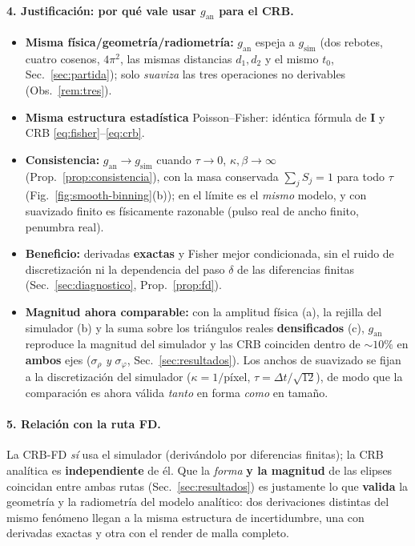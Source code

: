 \documentclass[11pt,a4paper]{article}
\theoremstyle{plain}
\theoremstyle{definition}
\newcommand{\matr}[1]{\mathbf{#1}}
\begin{document}
\paragraph{4. Justificaci\'on: por qu\'e vale usar $g_{\mathrm{an}}$ para el CRB.}
\begin{itemize}[nosep]
    \item \textbf{Misma f\'isica/geometr\'ia/radiometr\'ia:} $g_{\mathrm{an}}$
    espeja a $g_{\mathrm{sim}}$ (dos rebotes, cuatro cosenos, $4\pi^2$, las mismas
    distancias $d_1,d_2$ y el mismo $t_0$, Sec.~\ref{sec:partida}); solo
    \emph{suaviza} las tres operaciones no derivables (Obs.~\ref{rem:tres}).
    \item \textbf{Misma estructura estad\'istica} Poisson--Fisher: id\'entica
    f\'ormula de $\matr I$ y CRB \eqref{eq:fisher}--\eqref{eq:crb}.
    \item \textbf{Consistencia:} $g_{\mathrm{an}}\to g_{\mathrm{sim}}$ cuando
    $\tau\to0$, $\kappa,\beta\to\infty$ (Prop.~\ref{prop:consistencia}), con la
    masa conservada $\sum_j S_j=1$ para todo $\tau$
    (Fig.~\ref{fig:smooth-binning}(b)); en el l\'imite es el \emph{mismo} modelo,
    y con suavizado finito es f\'isicamente razonable (pulso real de ancho finito,
    penumbra real).
    \item \textbf{Beneficio:} derivadas \textbf{exactas} y Fisher mejor
    condicionada, sin el ruido de discretizaci\'on ni la dependencia del paso
    $\delta$ de las diferencias finitas (Sec.~\ref{sec:diagnostico},
    Prop.~\ref{prop:fd}).
    \item \textbf{Magnitud ahora comparable:} con la amplitud f\'isica (a), la
    rejilla del simulador (b) y la suma sobre los tri\'angulos reales
    \textbf{densificados} (c), $g_{\mathrm{an}}$ reproduce la magnitud del
    simulador y las CRB coinciden dentro de $\sim\!10\%$ en \textbf{ambos} ejes
    ($\sigma_\rho$ \emph{y} $\sigma_\varphi$, Sec.~\ref{sec:resultados}). Los anchos
    de suavizado se fijan a la discretizaci\'on del simulador ($\kappa=1/$p\'ixel,
    $\tau=\Delta t/\sqrt{12}$), de modo que la comparaci\'on es ahora v\'alida
    \emph{tanto} en forma \emph{como} en tama\~no.
\end{itemize}

\paragraph{5. Relaci\'on con la ruta FD.} La CRB-FD \emph{s\'i} usa el simulador
(deriv\'andolo por diferencias finitas); la CRB anal\'itica es \textbf{independiente}
de \'el. Que la \emph{forma} \textbf{y la magnitud} de las elipses coincidan entre
ambas rutas (Sec.~\ref{sec:resultados}) es justamente lo que \textbf{valida} la
geometr\'ia y la radiometr\'ia del modelo anal\'itico: dos derivaciones distintas
del mismo fen\'omeno llegan a la misma estructura de incertidumbre, una con
derivadas exactas y otra con el render de malla completo.
\end{document}
